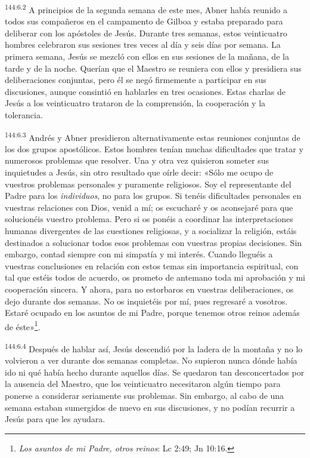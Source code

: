 \par 
\textsuperscript{144:6.2} A principios de la segunda semana de este mes, Abner había reunido a todos sus compañeros en el campamento de Gilboa y estaba preparado para deliberar con los apóstoles de Jesús. Durante tres semanas, estos veinticuatro hombres celebraron sus sesiones tres veces al día y seis días por semana. La primera semana, Jesús se mezcló con ellos en sus sesiones de la mañana, de la tarde y de la noche. Querían que el Maestro se reuniera con ellos y presidiera sus deliberaciones conjuntas, pero él se negó firmemente a participar en sus discusiones, aunque consintió en hablarles en tres ocasiones. Estas charlas de Jesús a los veinticuatro trataron de la comprensión, la cooperación y la tolerancia.

\par 
\textsuperscript{144:6.3} Andrés y Abner presidieron alternativamente estas reuniones conjuntas de los dos grupos apostólicos. Estos hombres tenían muchas dificultades que tratar y numerosos problemas que resolver. Una y otra vez quisieron someter sus inquietudes a Jesús, sin otro resultado que oírle decir: «Sólo me ocupo de vuestros problemas personales y puramente religiosos. Soy el representante del Padre para los \textit{individuos}, no para los grupos. Si tenéis dificultades personales en vuestras relaciones con Dios, venid a mí; os escucharé y os aconsejaré para que solucionéis vuestro problema. Pero si os ponéis a coordinar las interpretaciones humanas divergentes de las cuestiones religiosas, y a socializar la religión, estáis destinados a solucionar todos esos problemas con vuestras propias decisiones. Sin embargo, contad siempre con mi simpatía y mi interés. Cuando lleguéis a vuestras conclusiones en relación con estos temas sin importancia espiritual, con tal que estéis todos de acuerdo, os prometo de antemano toda mi aprobación y mi cooperación sincera. Y ahora, para no estorbaros en vuestras deliberaciones, os dejo durante dos semanas. No os inquietéis por mí, pues regresaré a vosotros. Estaré ocupado en los asuntos de mi Padre, porque tenemos otros reinos además de éste»\footnote{\textit{Los asuntos de mi Padre, otros reinos}: Lc 2:49; Jn 10:16.}.

\par 
\textsuperscript{144:6.4} Después de hablar así, Jesús descendió por la ladera de la montaña y no lo volvieron a ver durante dos semanas completas. No supieron nunca dónde había ido ni qué había hecho durante aquellos días. Se quedaron tan desconcertados por la ausencia del Maestro, que los veinticuatro necesitaron algún tiempo para ponerse a considerar seriamente sus problemas. Sin embargo, al cabo de una semana estaban sumergidos de nuevo en sus discusiones, y no podían recurrir a Jesús para que les ayudara.

